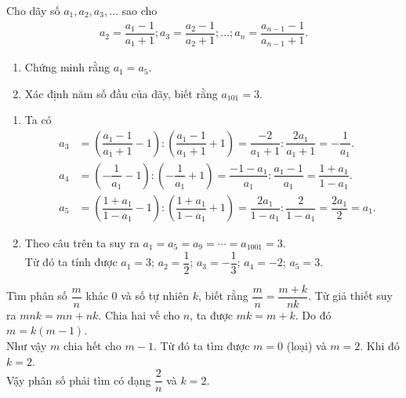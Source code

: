 \begin{bt}%
 Cho dãy số $a_1,a_2,a_3,\ldots$ sao cho
 \begin{eqnarray*}
  a_2=\dfrac{a_1-1}{a_1+1}; a_3=\dfrac{a_2-1}{a_2+1}; \ldots ; a_n=\dfrac{a_{n-1}-1}{a_{n-1}+1}.
 \end{eqnarray*}
 \begin{enumerate}
  \item Chứng minh rằng $a_1=a_5$.
  \item Xác định năm số đầu của dãy, biết rằng $a_{101}=3$.
 \end{enumerate}
 \loigiai
  {
  \begin{enumerate}
   \item Ta có
   \allowdisplaybreaks
   \begin{eqnarray*}
    &a_3& = \left(\dfrac{a_1-1}{a_1+1}-1\right) : \left(\dfrac{a_1-1}{a_1+1}+1\right) = \dfrac{-2}{a_1 + 1} : \dfrac{2a_1}{a_1+1} = -\dfrac{1}{a_1}.\\
    &a_4& = \left(-\dfrac{1}{a_1}-1\right) : \left(-\dfrac{1}{a_1}+1\right) = \dfrac{-1-a_1}{a_1} : \dfrac{a_1-1}{a_1} = \dfrac{1+a_1}{1-a_1}.\\
    &a_5& = \left(\dfrac{1+a_1}{1-a_1}-1\right) : \left(\dfrac{1+a_1}{1-a_1}+1\right) = \dfrac{2a_1}{1-a_1} : \dfrac{2}{1-a_1} = \dfrac{2a_1}{2} = a_1.
   \end{eqnarray*}
   \item Theo câu trên ta suy ra $a_1=a_5=a_9= \cdots = a_{1001}=3$.\\
   Từ đó ta tính được $a_1=3$; $a_2=\dfrac{1}{2}$; $a_3=-\dfrac{1}{3}$; $a_4=-2$; $a_5=3$.
  \end{enumerate}
  }
\end{bt}

\begin{bt}%
 Tìm phân số $\dfrac{m}{n}$ khác $0$ và số tự nhiên $k$, biết rằng $\dfrac{m}{n} = \dfrac{m+k}{nk}$.
 \loigiai
  {
  Từ giả thiết suy ra $mnk=mn+nk$. Chia hai vế cho $n$, ta được $mk=m+k$. Do đó $m=k(m-1)$.\\
  Như vậy $m$ chia hết cho $m-1$. Từ đó ta tìm được $m=0$ (loại) và $m=2$. Khi đó $k=2$.\\
  Vậy phân số phải tìm có dạng $\dfrac{2}{n}$ và $k=2$.
  }
\end{bt}


